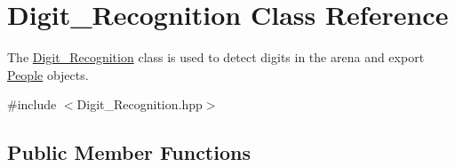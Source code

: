 \hypertarget{class_digit___recognition}{}\section{Digit\+\_\+\+Recognition Class Reference}
\label{class_digit___recognition}


The \mbox{\hyperlink{class_digit___recognition}{Digit\+\_\+\+Recognition}} class is used to detect digits in the arena and export \mbox{\hyperlink{class_people}{People}} objects.  




{\ttfamily \#include $<$Digit\+\_\+\+Recognition.\+hpp$>$}

\subsection*{Public Member Functions}
